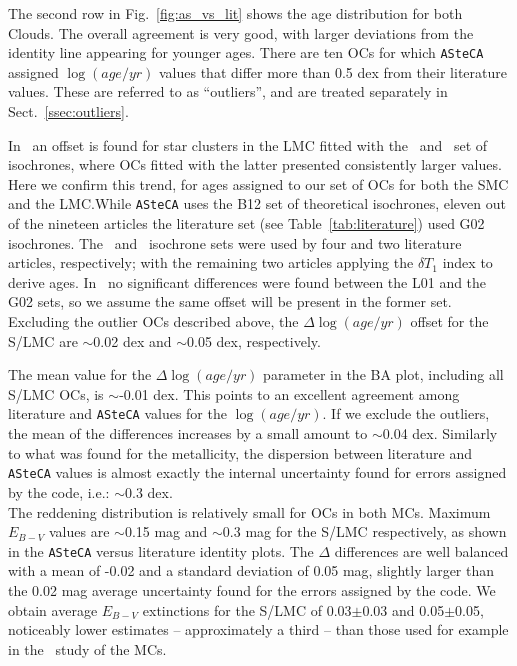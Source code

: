 \documentclass[a4paper,fleqn,usenatbib]{mnras}
\begin{document}
The second row in Fig.~\ref{fig:as_vs_lit} shows the age distribution for both
Clouds. The overall agreement is very good, with larger deviations from the
identity line appearing for younger ages. There are ten OCs for which
\texttt{ASteCA} assigned $\log(age/yr)$ values that differ more than 0.5 dex
from their literature values. These are referred to as ``outliers'', and are
treated separately in Sect.~\ref{ssec:outliers}.

In~\cite{Palma_2015b} an offset is found for star clusters in the LMC
fitted with the~\citet[][G02]{Girardi_2002} and~\citet[][B12]{Bressan_2012} set
of isochrones, where OCs fitted with the latter presented consistently larger
values.
%
Here we confirm this trend, for ages assigned to our set of OCs for both the
SMC and the LMC.\@ While \texttt{ASteCA} uses the B12 set of theoretical
isochrones, eleven out of the nineteen articles the literature set 
(see Table~\ref{tab:literature}) used G02 isochrones.
The~\citet[][L01]{Lejeune_2001} and~\cite{Marigo_2008} isochrone sets were used
by four and two literature articles, respectively; with the remaining two
articles applying the $\delta T_1$ index to derive ages.
In~\cite{Piatti_2003b,Piatti_2003a,Piatti_2007a} no significant
differences were found between the L01 and the G02 sets, so we assume the same
offset will be present in the former set.
%
Excluding the outlier OCs described above, the $\Delta \log(age/yr)$ offset for
the S/LMC are $\sim$0.02 dex and $\sim$0.05 dex, respectively.

The mean value for the $\Delta \log(age/yr)$ parameter in the BA plot, including
all S/LMC OCs, is $\sim$-0.01 dex. This points to an excellent agreement among
literature and \texttt{ASteCA} values for the $\log(age/yr)$.
If we exclude the outliers, the mean of the differences increases by a small
amount to $\sim$0.04 dex. Similarly to what was found for the metallicity,
the dispersion between literature and \texttt{ASteCA} values is almost exactly
the internal uncertainty found for errors assigned by the code, i.e.: $\sim$0.3
dex.\\

The reddening distribution is relatively small for OCs in both MCs. Maximum
$E_{B-V}$ values are $\sim$0.15 mag and $\sim$0.3 mag for the S/LMC
respectively, as shown in the \texttt{ASteCA} versus literature identity plots.
The $\Delta$ differences are well balanced with a mean of -0.02 and a
standard deviation of 0.05 mag, slightly larger than the 0.02 mag average
uncertainty found for the errors assigned by the code. We obtain average
$E_{B-V}$ extinctions for the S/LMC of 0.03$\pm$0.03 and 0.05$\pm$0.05,
noticeably lower estimates -- approximately a third -- than those used for
example in the~\cite{Hunter_2003} study of the MCs.\\
\end{document}
